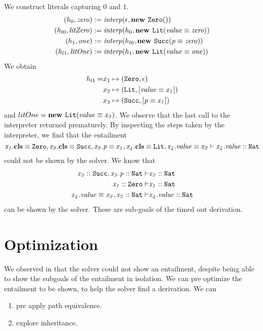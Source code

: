 We construct literals capturing $0$ and $1$.
\begin{align*}
  (h_0, \mathit{zero}) &:= \mathit{interp}(\epsilon, \textbf{new } \mathit{\texttt{Zero}}())\\
  (h_{l0}, \mathit{litZero}) &:= \mathit{interp}(h_0, \textbf{new } \mathit{\texttt{Lit}}(\mathit{\mathit{value}} \equiv \mathit{\mathit{zero}}))\\
  (h_1, \mathit{one}) &:= \mathit{interp}(h_{l0}, \textbf{new } \mathit{\texttt{Succ}}(\mathit{p} \equiv \mathit{\mathit{zero}}))\\
  (h_{l1}, \mathit{litOne}) &:= \mathit{interp}(h_1, \textbf{new } \mathit{\texttt{Lit}}(\mathit{\mathit{value}} \equiv \mathit{\mathit{one}}))
\end{align*}
We obtain
\begin{align*}
h_{l1} = &x_1 \mapsto (\texttt{Zero}, \epsilon)\\
         &x_2 \mapsto (\texttt{Lit}, [\mathit{\mathit{value}} \equiv \mathit{x_1}])\\
         &x_3 \mapsto (\texttt{Succ}, [\mathit{\mathit{p}} \equiv \mathit{x_1}])
\end{align*}
and $litOne = \textbf{new } \mathit{\texttt{Lit}}(\mathit{\mathit{value}} \equiv \mathit{\mathit{x_3}})$.
We observe that the last call to the interpreter
returned prematurely.
By inspecting the steps taken by the interpreter, we find that
the entailment
\[
  \entails{
            \instBy{x_1}{\texttt{Zero}},
            \instBy{x_3}{\texttt{Succ}},
            \pathEq{x_3.p}{x_1},
            \instBy{x_4}{\texttt{Lit}},
            \pathEq{x_4.value}{x_3}
          }
          {\instOf{x_4.value}{\texttt{Nat}}}
\]
could not be shown by the solver.
We know that
\begin{align*}
\entails
  {
    \instOf{x_3}{\texttt{Succ}},
    \instOf{x_3.p}{\texttt{Nat}}
  }
  {&\instOf{x_3}{\texttt{Nat}}}\\
\entails
  {\instOf{x_1}{\texttt{Zero}}}
  {&\instOf{x_1}{\texttt{Nat}}}\\
\entails
  {\pathEq{x_4.value}{x_3},
   \instOf{x_3}{\texttt{Nat}}}
  {&\instOf{x_4.value}{\texttt{Nat}}}
\end{align*}
can be shown by the solver.
These are sub-goals of the timed out derivation.

\section{Optimization}
\label{sec:runtime-optimization}
We observed in 
that the solver could not show an entailment,
despite being able to show the subgoals of the entailment
in isolation.
We can pre optimize the entailment to be shown,
to help the solver find a derivation.
We can
\begin{enumerate}
  \item pre apply path equivalence.
  \item explore inheritance.
\end{enumerate}

